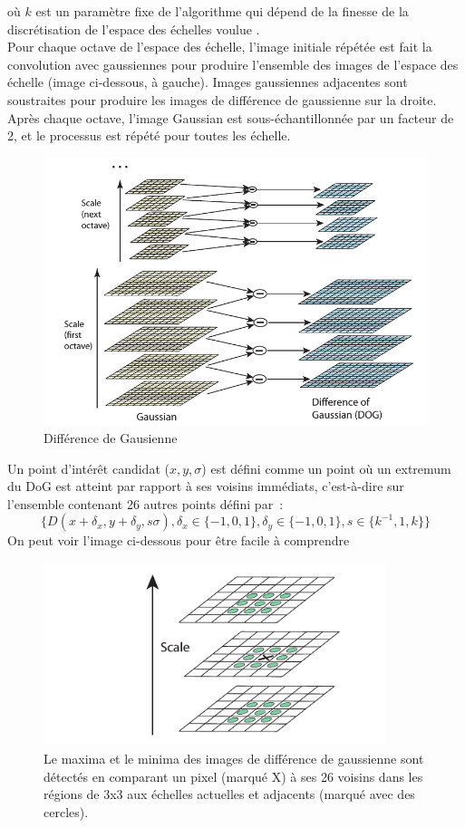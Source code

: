 où $k$ est un paramètre fixe de l'algorithme qui dépend de la finesse de la discrétisation de l'espace des échelles voulue \cite{low04}.\\

Pour chaque octave de l'espace des échelle, l'image initiale répétée est fait la convolution avec gaussiennes pour produire l'ensemble des images de l'espace des échelle (image ci-dessous, à gauche). Images gaussiennes adjacentes sont soustraites
pour produire les images de différence de gaussienne sur la droite. Après chaque octave, l'image Gaussian est sous-échantillonnée par un facteur de 2, et le processus est répété pour toutes les échelle.

\begin{figure}[ht!]
\centering
\includegraphics[width=150mm]{images/dog}
\caption{Différence de Gausienne \cite{low04}}
\label{overflow}
\end{figure}

Un point d'intérêt candidat ($x,y,\sigma$) est défini comme un point où un extremum du DoG est atteint par rapport à ses voisins immédiats, c'est-à-dire sur l'ensemble contenant 26 autres points défini par~:
\[
\{ D \left( x + \delta_x, y + \delta_y, s \sigma \right), \delta_x \in \{-1, 0, 1\}, \delta_y \in \{-1,0, 1\}, s \in \{k^{-1}, 1, k\} \} 
\]
On peut voir l'image ci-dessous pour être facile à comprendre
\begin{figure}[ht!]
\centering
\includegraphics[width=100mm]{images/select_point}
\caption{\cite{low04} Le maxima et le minima des images de différence de gaussienne sont détectés en comparant un pixel (marqué X) à ses 26 voisins dans les régions de 3x3 aux échelles actuelles et adjacents (marqué avec des cercles).}
\label{overflow}
\end{figure}

